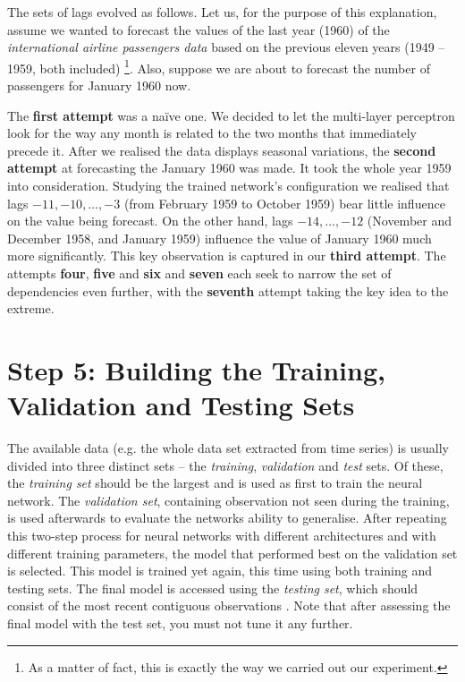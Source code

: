 The sets of lags evolved as follows. Let us, for the purpose of this explanation, assume we wanted to forecast the values of the last year (1960) of the \textit{international airline passengers data} based on the previous eleven years (1949 -- 1959, both included) \footnote{As a matter of fact, this is exactly the way we carried out our experiment.}. Also, suppose we are about to forecast the number of passengers for January 1960 now.

The \textbf{first attempt} was a na\"{i}ve one. We decided to let the multi-layer perceptron look for the way any month is related to the two months that immediately precede it. After we realised the data displays seasonal variations, the \textbf{second attempt} at forecasting the January 1960 was made. It took the whole year 1959 into consideration. Studying the trained network's configuration we realised that lags $ -11, -10, \ldots, -3 $ (from February 1959 to October 1959) bear little influence on the value being forecast. On the other hand, lags $ -14, \ldots, -12 $ (November and December 1958, and January 1959) influence the value of January 1960 much more significantly. This key observation is captured in our \textbf{third attempt}. The attempts \textbf{four}, \textbf{five} and \textbf{six} and \textbf{seven} each seek to narrow the set of dependencies even further, with the \textbf{seventh} attempt taking the key idea to the extreme.

\section{Step 5: Building the Training, Validation and Testing Sets}

The available data (e.g. the whole data set extracted from time series) is usually divided into three distinct sets -- the \textit{training}, \textit{validation} and \textit{test} sets. Of these, the \textit{training set} should be the largest and is used as first to train the neural network. The \textit{validation set}, containing observation not seen during the training, is used afterwards to evaluate the networks ability to generalise. After repeating this two-step process for neural networks with different architectures and with different training parameters, the model that performed best on the validation set is selected. This model is trained yet again, this time using both training and testing sets. The final model is accessed using the \textit{testing set}, which should consist of the most recent contiguous observations \cite{Kaastra95}. Note that after assessing the final model with the test set, you must not tune it any further.

